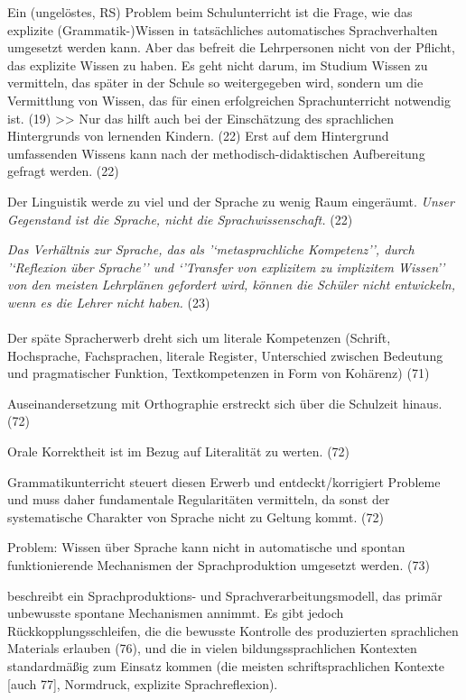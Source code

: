 Ein (ungelöstes, RS) Problem beim Schulunterricht ist die Frage, wie das explizite (Grammatik-)Wissen in tatsächliches automatisches Sprachverhalten umgesetzt werden kann.
Aber das befreit die Lehrpersonen nicht von der Pflicht, das explizite Wissen zu haben.
Es geht nicht darum, im Studium Wissen zu vermitteln, das später in der Schule so weitergegeben wird, sondern um die Vermittlung von Wissen, das für einen erfolgreichen Sprachunterricht notwendig ist. (19)
>>
Nur das hilft auch bei der Einschätzung des sprachlichen Hintergrunds von lernenden Kindern. (22)
Erst auf dem Hintergrund umfassenden Wissens kann nach der methodisch-didaktischen Aufbereitung gefragt werden. (22)


Der Linguistik werde zu viel und der Sprache zu wenig Raum eingeräumt. 
\textit{Unser Gegenstand ist die Sprache, nicht die Sprachwissenschaft.} (22)

\textit{Das Verhältnis zur Sprache, das als '`metasprachliche Kompetenz'', durch '`Reflexion über Sprache'' und `'Transfer von explizitem zu implizitem Wissen'' von den meisten Lehrplänen gefordert wird, können die Schüler nicht entwickeln, wenn es die Lehrer nicht haben.} (23)


\paragraph{\citet{Portmanntselikas2011}}

Der späte Spracherwerb dreht sich um literale Kompetenzen (Schrift, Hochsprache, Fachsprachen, literale Register, Unterschied zwischen Bedeutung und pragmatischer Funktion, Textkompetenzen \zB in Form von Kohärenz) (71)

Auseinandersetzung mit Orthographie erstreckt sich über die Schulzeit hinaus. (72)

Orale Korrektheit ist im Bezug auf Literalität zu werten. (72)

Grammatikunterricht steuert diesen Erwerb und entdeckt/korrigiert Probleme und muss daher fundamentale Regularitäten vermitteln, da sonst der systematische Charakter von Sprache nicht zu Geltung kommt. (72)

Problem: Wissen über Sprache kann nicht in automatische und spontan funktionierende Mechanismen der Sprachproduktion umgesetzt werden. (73)

\citet[75--79]{Portmanntselikas2011} beschreibt ein Sprachproduktions- und Sprachverarbeitungsmodell, das primär unbewusste spontane Mechanismen annimmt.
Es gibt jedoch Rückkopplungsschleifen, die die bewusste Kontrolle des produzierten sprachlichen Materials erlauben (76), und die in vielen bildungssprachlichen Kontexten standardmäßig zum Einsatz kommen (die meisten schriftsprachlichen Kontexte [auch 77], Normdruck, explizite Sprachreflexion).


